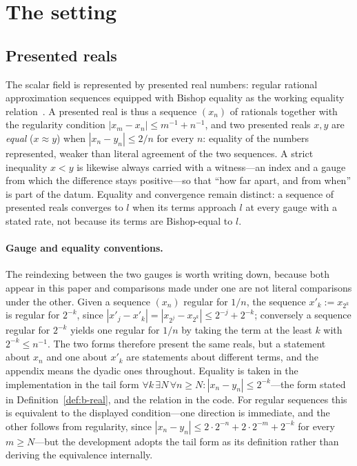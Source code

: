 \documentclass[11pt]{article}
\theoremstyle{definition}
\theoremstyle{remark}
\begin{document}
\section{The setting}
\label{sec:setting}

\subsection{Presented reals}
\label{sec:presented}
The scalar field is represented by presented real numbers: regular rational approximation sequences equipped with Bishop equality as the working equality relation~\cite{bishop-1967,bishop-bridges-1985}.  A presented real is thus a sequence $(x_n)$ of rationals together with the regularity condition $|x_m-x_n|\le m^{-1}+n^{-1}$, and two presented reals $x,y$ are \emph{equal} ($x\approx y$) when $|x_n-y_n|\le 2/n$ for every $n$: equality of the numbers represented, weaker than literal agreement of the two sequences.  A strict inequality $x<y$ is likewise always carried with a witness---an index and a gauge from which the difference stays positive---so that ``how far apart, and from when'' is part of the datum.  Equality and convergence remain distinct: a sequence of presented reals converges to $l$ when its terms approach $l$ at every gauge with a stated rate, not because its terms are Bishop-equal to $l$.

\paragraph{Gauge and equality conventions.}
The reindexing between the two gauges is worth writing down, because both appear in this paper and comparisons made under one are not literal comparisons under the other.  Given a sequence $(x_n)$ regular for $1/n$, the sequence $x'_k:=x_{2^k}$ is regular for $2^{-k}$, since $|x'_j-x'_k|=|x_{2^j}-x_{2^k}|\le 2^{-j}+2^{-k}$; conversely a sequence regular for $2^{-k}$ yields one regular for $1/n$ by taking the term at the least $k$ with $2^{-k}\le n^{-1}$.  The two forms therefore present the same reals, but a statement about $x_n$ and one about $x'_k$ are statements about different terms, and the appendix means the dyadic ones throughout.  Equality is taken in the implementation in the tail form $\forall k\,\exists N\,\forall n\ge N\colon|x_n-y_n|\le2^{-k}$---the form stated in Definition~\ref{def:b-real}, and the relation  in the code.  For regular sequences this is equivalent to the displayed condition---one direction is immediate, and the other follows from regularity, since $|x_n-y_n|\le2\cdot2^{-n}+2\cdot2^{-m}+2^{-k}$ for every $m\ge N$---but the development adopts the tail form as its definition rather than deriving the equivalence internally.
\end{document}
